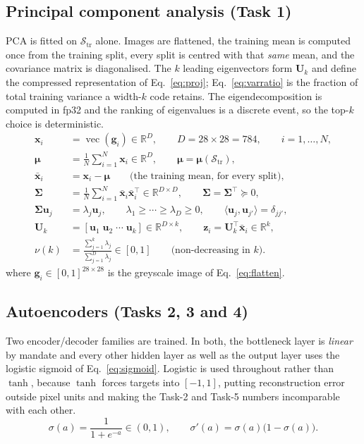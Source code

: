 \documentclass[11pt,a4paper]{article}
\newcommand{\R}{\mathbb{R}}\newcommand{\given}{\mid}\newcommand{\Acc}{\mathrm{Acc}}
\begin{document}
\subsection{Principal component analysis (Task 1)}\label{sec:arch:pca}
PCA is fitted on $\mathcal{S}_{\mathrm{tr}}$ alone.  Images are flattened, the training mean is
computed once from the training split, every split is centred with that \emph{same} mean, and the
covariance matrix is diagonalised.  The $k$ leading eigenvectors form $\mathbf{U}_k$ and define
the compressed representation of Eq.~\eqref{eq:proj}; Eq.~\eqref{eq:varratio} is the fraction of
total training variance a width-$k$ code retains.  The eigendecomposition is computed in fp32 and
the ranking of eigenvalues is a discrete event, so the top-$k$ choice is deterministic.
\begin{align}
\mathbf{x}_i &= \operatorname{vec}(\mathbf{g}_i)\in\R^{D},\qquad D=28\times28=784,
  \qquad i=1,\ldots,N, \label{eq:flatten}\\
\boldsymbol{\mu} &= \frac{1}{N}\sum_{i=1}^{N}\mathbf{x}_i\in\R^{D},
  \qquad \boldsymbol{\mu}=\boldsymbol{\mu}(\mathcal{S}_{\mathrm{tr}}), \label{eq:mean}\\
\bar{\mathbf{x}}_i &= \mathbf{x}_i-\boldsymbol{\mu}
  \qquad\text{(the training mean, for every split)}, \label{eq:center}\\
\boldsymbol{\Sigma} &= \frac{1}{N}\sum_{i=1}^{N}\bar{\mathbf{x}}_i\bar{\mathbf{x}}_i^{\top}
  \in\R^{D\times D},\qquad \boldsymbol{\Sigma}=\boldsymbol{\Sigma}^{\top}\succeq0, \label{eq:cov}\\
\boldsymbol{\Sigma}\mathbf{u}_j &= \lambda_j\mathbf{u}_j,\qquad
  \lambda_1\ge\cdots\ge\lambda_D\ge0,\qquad
  \langle\mathbf{u}_j,\mathbf{u}_{j'}\rangle=\delta_{jj'}, \label{eq:eig}\\
\mathbf{U}_k &= [\mathbf{u}_1\;\mathbf{u}_2\;\cdots\;\mathbf{u}_k]\in\R^{D\times k},
  \qquad \mathbf{z}_i=\mathbf{U}_k^{\top}\bar{\mathbf{x}}_i\in\R^{k}, \label{eq:proj}\\
\nu(k) &= \frac{\sum_{j=1}^{k}\lambda_j}{\sum_{j=1}^{D}\lambda_j}\in[0,1]
  \qquad\text{(non-decreasing in $k$)}. \label{eq:varratio}
\end{align}
where $\mathbf{g}_i\in[0,1]^{28\times28}$ is the greyscale image of Eq.~\eqref{eq:flatten}.

\subsection{Autoencoders (Tasks 2, 3 and 4)}\label{sec:arch:ae}
Two encoder/decoder families are trained.  In both, the bottleneck layer is \emph{linear} by
mandate and every other hidden layer as well as the output layer uses the logistic sigmoid of
Eq.~\eqref{eq:sigmoid}.  Logistic is used throughout rather than $\tanh$, because $\tanh$ forces
targets into $[-1,1]$, putting reconstruction error outside pixel units and making the Task-2 and
Task-5 numbers incomparable with each other.
\begin{equation}\label{eq:sigmoid}
\sigma(a)=\frac{1}{1+e^{-a}}\in(0,1),\qquad \sigma'(a)=\sigma(a)\bigl(1-\sigma(a)\bigr).
\end{equation}
\end{document}
